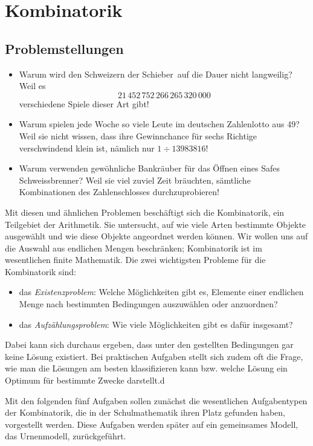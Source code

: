 \documentclass[%
11pt,%
twoside,%
titlepage,%
german,%
headsepline%
]{scrartcl}
\begin{document}
\appendix

\section{Kombinatorik}
\subsection{Problemstellungen}
\begin{itemize}
\item Warum wird den Schweizern der \glqq Schieber\grqq\ auf die Dauer nicht langweilig? Weil es
$$21\,452\,752\,266\,265\,320\,000$$
verschiedene Spiele dieser Art gibt!
\item Warum spielen jede Woche so viele Leute im deutschen Zahlenlotto  aus 49\grqq?
Weil sie nicht wissen, dass ihre Gewinnchance für sechs Richtige verschwindend klein ist, nämlich nur $1\div13983816$!
\item Warum verwenden gewöhnliche Bankräuber für das Öffnen eines Safes Schweissbrenner?
Weil sie viel zuviel Zeit bräuchten, sämtliche Kombinationen des Zahlenschlosses durchzuprobieren!
\end{itemize}

Mit diesen und ähnlichen Problemen beschäftigt sich die Kombinatorik, ein Teilgebiet der Arithmetik. Sie untersucht, auf wie viele Arten bestimmte Objekte ausgewählt und wie diese Objekte angeordnet werden können. Wir wollen uns auf die Auswahl aus endlichen Mengen beschränken; Kombinatorik ist im wesentlichen finite Mathematik. Die zwei wichtigsten Probleme für die Kombinatorik sind:
\begin{itemize}
\item das \emph{Existenzproblem}: Welche Möglichkeiten gibt es, Elemente einer endlichen Menge nach bestimmten Bedingungen auszuwählen oder anzuordnen?
\item das \emph{Aufzählungsproblem}: Wie viele Möglichkeiten gibt es dafür insgesamt?
\end{itemize}

Dabei kann sich durchaus ergeben, dass unter den gestellten Bedingungen gar keine Lösung existiert. Bei praktischen Aufgaben stellt sich zudem oft die Frage, wie man die Lösungen am besten klassifizieren kann bzw. welche Lösung ein Optimum für bestimmte Zwecke darstellt.d

Mit den folgenden fünf Aufgaben sollen zunächst die wesentlichen Aufgabentypen der Kombinatorik, die in der Schulmathematik ihren Platz gefunden haben, vorgestellt werden. Diese Aufgaben werden später auf ein gemeinsames Modell, das Urnenmodell, zurückgeführt.
\end{document}
